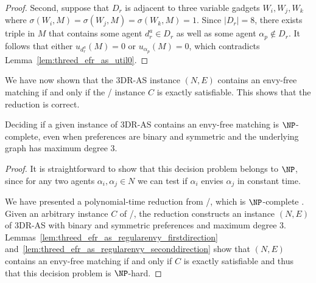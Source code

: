 \begin{proof}
Second, suppose that $D_r$ is adjacent to three variable gadgets $W_i, W_j, W_k$ where $\sigma(W_i, M)=\sigma(W_j, M)=\sigma(W_k, M)=1$. Since $|D_r|=8$, there exists triple in $M$ that contains some agent $d_r^a \in D_r$ as well as some agent $\alpha_p \notin D_r$. It follows that either $u_{d_r^a}(M)=0$ or $u_{\alpha_p}(M)=0$, which contradicts Lemma~\ref{lem:threed_efr_as_util0}.
\end{proof}

We have now shown that the 3DR-AS instance $(N, E)$ contains an envy-free matching if and only if the \porschenxsatvariant/ instance $C$ is exactly satisfiable. This shows that the reduction is correct.

\begin{thm}
\label{thm:threed_efr_as_regularenvy_npcomplete}
Deciding if a given instance of 3DR-AS contains an envy-free matching is $\NP$-complete, even when preferences are binary and symmetric and the underlying graph has maximum degree $3$.
\end{thm}
\begin{proof}
It is straightforward to show that this decision problem belongs to $\NP$, since for any two agents $\alpha_i, \alpha_j \in N$ we can test if $\alpha_i$ envies $\alpha_j$ in constant time. 

We have presented a polynomial-time reduction from \porschenxsatvariant/, which is $\NP$-complete \cite{PSSW14}. Given an arbitrary instance $C$ of \porschenxsatvariant/, the reduction constructs an instance $(N, E)$ of 3DR-AS with binary and symmetric preferences and maximum degree $3$. Lemmas~\ref{lem:threed_efr_as_regularenvy_firstdirection} and~\ref{lem:threed_efr_as_regularenvy_seconddirection} show that $(N, E)$ contains an envy-free matching if and only if $C$ is exactly satisfiable and thus that this decision problem is $\NP$-hard.
\end{proof}
